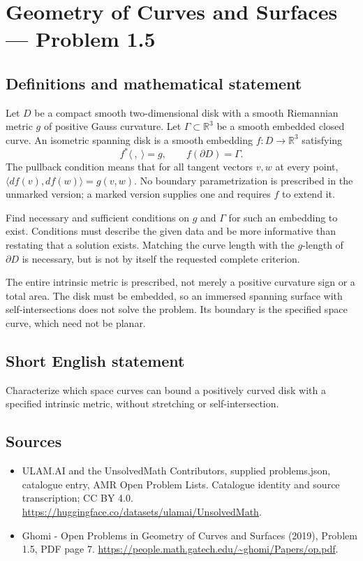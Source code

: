 \documentclass[11pt,a4paper]{article}
\begin{document}
\section*{Geometry of Curves and Surfaces — Problem 1.5}\label{statement}

\subsection{Definitions and mathematical statement}
Let $D$ be a compact smooth two-dimensional disk with a smooth
Riemannian metric $g$ of positive Gauss curvature. Let
$\Gamma\subset\mathbb R^3$ be a smooth embedded closed curve.
An isometric spanning disk is a smooth embedding
$f:D\to\mathbb R^3$ satisfying
\[
                      f^*\langle\ ,\ \rangle=g,
                      \qquad f(\partial D)=\Gamma.
\]
The pullback condition means that for all tangent vectors $v,w$
at every point, $\langle df(v),df(w)\rangle=g(v,w)$. No boundary
parametrization is prescribed in the unmarked version; a marked
version supplies one and requires $f$ to extend it.

Find necessary and sufficient conditions on $g$ and $\Gamma$ for
such an embedding to exist. Conditions must describe the given
data and be more informative than restating that a solution
exists. Matching the curve length with the $g$-length of
$\partial D$ is necessary, but is not by itself the requested
complete criterion.

The entire intrinsic metric is prescribed, not merely a positive
curvature sign or a total area. The disk must be embedded, so an
immersed spanning surface with self-intersections does not solve
the problem. Its boundary is the specified space curve, which
need not be planar.
\subsection{Short English statement}
Characterize which space curves can bound a positively curved disk
with a specified intrinsic metric, without stretching or
self-intersection.
\subsection{Sources}
\begin{itemize}
\item[S1] ULAM.AI and the UnsolvedMath Contributors, supplied problems.json, catalogue entry, AMR Open Problem Lists. Catalogue identity and source transcription; CC BY 4.0.
\url{https://huggingface.co/datasets/ulamai/UnsolvedMath}.
\item[S2] Ghomi - Open Problems in Geometry of Curves and Surfaces (2019), Problem 1.5, PDF page 7. 
\url{https://people.math.gatech.edu/~ghomi/Papers/op.pdf}.
\end{itemize}
\end{document}
